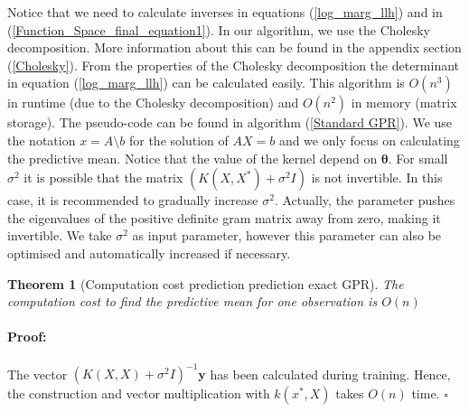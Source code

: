 \documentclass[12pt,a4paper,oneside]{book}
\makeatletter
\newtheorem{Theorem}{Theorem}
\newenvironment{proof}{\paragraph{Proof:}}{\hfill$\square$}
\def\BState{\State\hskip-\ALG@thistlm}
\makeatother
\begin{document}
Notice that we need to calculate inverses in equations (\ref{log_marg_llh}) and in (\ref{Function_Space_final_equation1}). In our algorithm, we use the Cholesky decomposition. More information about this can be found in the appendix section (\ref{Cholesky}). From the properties of the Cholesky decomposition the determinant in equation (\ref{log_marg_llh}) can be calculated easily. This algorithm is $O(n^3)$ in runtime (due to the Cholesky decomposition) and $O(n^2)$ in memory (matrix storage). The pseudo-code can be found in algorithm (\ref{Standard GPR}). We use the notation $x = A \setminus b$ for the solution of $AX = b$ and we only focus on calculating the predictive mean. Notice that the value of the kernel depend on $\bm{\theta}$. For small $\sigma^2$ it is possible that the matrix $(K(X, X^{\ast}) + \sigma^2 I)$ is not invertible.  In this case, it is recommended to gradually increase $\sigma^2$. Actually, the parameter pushes the eigenvalues of the positive definite gram matrix away from zero, making it invertible. We take $\sigma^2$ as input parameter, however this parameter can also be optimised and automatically increased if necessary. 


\begin{algorithm}
\caption{Standard GPR}\label{Standard GPR}
\end{algorithm}

\begin{Theorem}[Computation cost prediction prediction exact GPR]
The computation cost to find the predictive mean for one observation is $O(n)$
\end{Theorem}
\begin{proof}
The vector $(K(X,X) + \sigma^2 I)^{-1} \bm{y}$ has been calculated during training. Hence, the construction and vector multiplication with $k(x^{\ast},X)$ takes $O(n)$ time.
\end{proof}
\end{document}
